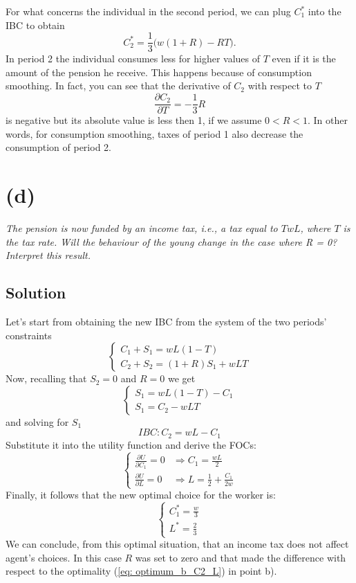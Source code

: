 \documentclass[a4paper,10pt]{report}
\begin{document}
For what concerns the individual in the second period, we can plug $ C_1^* $ into the IBC to obtain 
\begin{equation}\label{oldC}
	C_2^* = \frac{1}{3}\bigg(w(1+R) - RT\bigg).
\end{equation} 
In period 2 the individual consumes less for higher values of $T$ even if it is the amount of the pension he receive. This happens because of consumption smoothing. In fact, you can see that the derivative of $C_2$ with respect to $T$
\[
    \frac{\partial{C_2}}{\partial{T}} = -\frac{1}{3}R
\]
is negative but its absolute value is less then 1, if we assume $0<R<1$.
In other words, for consumption smoothing, taxes of period 1 also decrease the consumption of period 2.
\newpage
\section*{(d)}
\textit{The pension is now funded by an income tax, i.e., a tax equal to $ T wL $, where $ T $ is the tax rate. Will the behaviour of the young change in the case where R = 0? Interpret this result.}
\subsection*{Solution}
Let's start from obtaining the new IBC from the system of the two periods' constraints
\[
\begin{cases}
        C_1 + S_1 = wL(1-T)\\
        C_2 + S_2 = (1+R)S_1 + wLT
\end{cases}    
\]
Now, recalling that $S_2=0$ and $R=0$ we get
\[
\begin{cases}
    S_1 = wL(1-T) - C_1\\
    S_1 = C_2 - wLT 
\end{cases}
\]
and solving for $S_1$
\[
   IBC: C_2 = wL - C_1
\] 
Substitute it into the utility function and derive the FOCs:
\[
\begin{cases}
	\frac{\partial{U}}{\partial{C_1}} = 0 &\Rightarrow C_1 = \frac{wL}{2} \\
	\frac{\partial{U}}{\partial{L}} = 0 &\Rightarrow L = \frac{1}{2} + \frac{C_1}{2w}
\end{cases}
\]
Finally, it follows that the new optimal choice for the worker is:
\[
\begin{cases}
		C_1^* = \frac{w}{3}\\
		L^* = \frac{2}{3}
\end{cases}
\]
We can conclude, from this optimal situation, that an income tax does not affect agent's choices. In this case $R$ was set to zero and that made the difference with respect to the optimality (\ref{eq: optimum_b_C2_L}) in point b).
\end{document}
